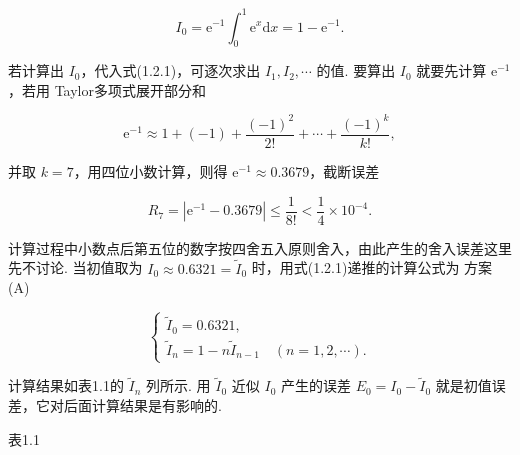 \documentclass[
  10pt,
  fontset=fandol]{ctexart}
\begin{document}
\[
I_0 = \mathrm{e}^{-1} \int_{0}^{1} \mathrm{e}^{x} \mathrm{d}x = 1 - \mathrm{e}^{-1}.
\]

若计算出 \(I_0\)，代入式(1.2.1)，可逐次求出 \(I_1, I_2, \cdots\) 的值. 要算出 \(I_0\) 就要先计算 \(\mathrm{e}^{-1}\)，若用 Taylor多项式展开部分和

\[
\mathrm{e}^{-1} \approx 1 + (-1) + \frac{(-1)^2}{2!} + \cdots + \frac{(-1)^k}{k!},
\]

并取 \(k=7\)，用四位小数计算，则得 \(\mathrm{e}^{-1} \approx 0.3679\)，截断误差

\[
R_7 = |\mathrm{e}^{-1} - 0.3679| \leqslant \frac{1}{8!} < \frac{1}{4} \times 10^{-4}.
\]

计算过程中小数点后第五位的数字按四舍五入原则舍入，由此产生的舍入误差这里先不讨论. 当初值取为 \(I_0 \approx 0.6321 = \tilde{I}_0\) 时，用式(1.2.1)递推的计算公式为 方案(A)

\[
\begin{cases}
\tilde{I}_0 = 0.6321, \\
\tilde{I}_n = 1 - n \tilde{I}_{n-1} \quad (n = 1,2,\cdots).
\end{cases}
\]

计算结果如表1.1的 \(\tilde{I}_n\) 列所示. 用 \(\tilde{I}_0\) 近似 \(I_0\) 产生的误差 \(E_0 = I_0 - \tilde{I}_0\) 就是初值误差，它对后面计算结果是有影响的.

表1.1
\end{document}
